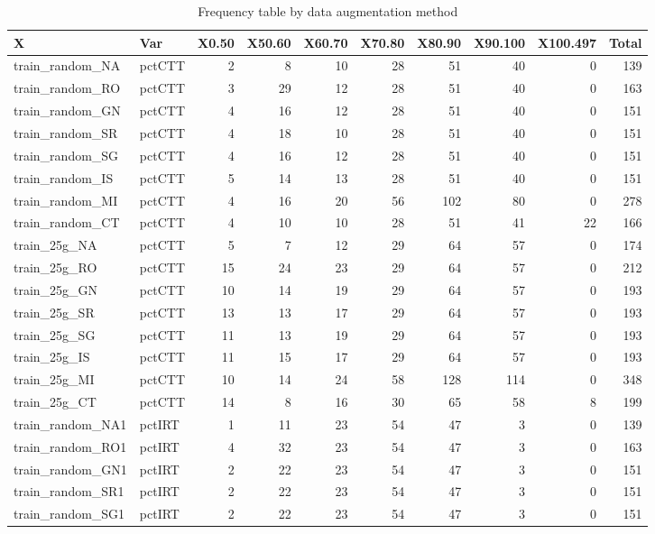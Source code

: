 \documentclass[sn-basic,pdflatex]{sn-jnl}
\theoremstyle{remark}
\theoremstyle{definition}
\begin{document}
\begin{table}[!h]
\centering
\caption{\label{tab:table_frequency}Frequency table by data augmentation method}
\centering
\begin{tabular}[t]{llrrrrrrrr}
\toprule
X & Var & X0.50 & X50.60 & X60.70 & X70.80 & X80.90 & X90.100 & X100.497 & Total\\
\midrule
train\_random\_NA & pctCTT & 2 & 8 & 10 & 28 & 51 & 40 & 0 & 139\\
train\_random\_RO & pctCTT & 3 & 29 & 12 & 28 & 51 & 40 & 0 & 163\\
train\_random\_GN & pctCTT & 4 & 16 & 12 & 28 & 51 & 40 & 0 & 151\\
train\_random\_SR & pctCTT & 4 & 18 & 10 & 28 & 51 & 40 & 0 & 151\\
train\_random\_SG & pctCTT & 4 & 16 & 12 & 28 & 51 & 40 & 0 & 151\\
\addlinespace
train\_random\_IS & pctCTT & 5 & 14 & 13 & 28 & 51 & 40 & 0 & 151\\
train\_random\_MI & pctCTT & 4 & 16 & 20 & 56 & 102 & 80 & 0 & 278\\
train\_random\_CT & pctCTT & 4 & 10 & 10 & 28 & 51 & 41 & 22 & 166\\
train\_25g\_NA & pctCTT & 5 & 7 & 12 & 29 & 64 & 57 & 0 & 174\\
train\_25g\_RO & pctCTT & 15 & 24 & 23 & 29 & 64 & 57 & 0 & 212\\
\addlinespace
train\_25g\_GN & pctCTT & 10 & 14 & 19 & 29 & 64 & 57 & 0 & 193\\
train\_25g\_SR & pctCTT & 13 & 13 & 17 & 29 & 64 & 57 & 0 & 193\\
train\_25g\_SG & pctCTT & 11 & 13 & 19 & 29 & 64 & 57 & 0 & 193\\
train\_25g\_IS & pctCTT & 11 & 15 & 17 & 29 & 64 & 57 & 0 & 193\\
train\_25g\_MI & pctCTT & 10 & 14 & 24 & 58 & 128 & 114 & 0 & 348\\
\addlinespace
train\_25g\_CT & pctCTT & 14 & 8 & 16 & 30 & 65 & 58 & 8 & 199\\
train\_random\_NA1 & pctIRT & 1 & 11 & 23 & 54 & 47 & 3 & 0 & 139\\
train\_random\_RO1 & pctIRT & 4 & 32 & 23 & 54 & 47 & 3 & 0 & 163\\
train\_random\_GN1 & pctIRT & 2 & 22 & 23 & 54 & 47 & 3 & 0 & 151\\
train\_random\_SR1 & pctIRT & 2 & 22 & 23 & 54 & 47 & 3 & 0 & 151\\
\addlinespace
train\_random\_SG1 & pctIRT & 2 & 22 & 23 & 54 & 47 & 3 & 0 & 151\\

\end{tabular}
\end{table}
\end{document}
